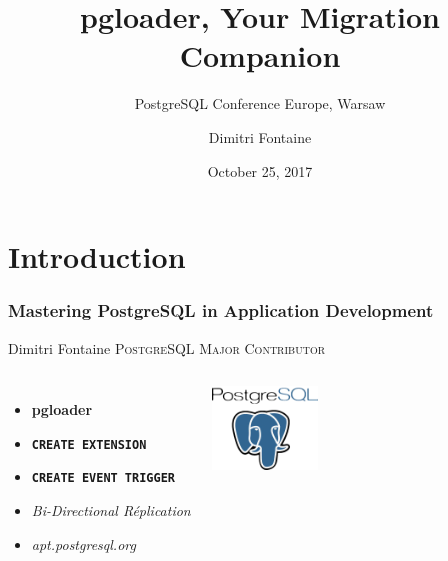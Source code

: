 \documentclass{beamer}
\title{pgloader, Your Migration Companion}
\subtitle{PostgreSQL Conference Europe, Warsaw}
\author{Dimitri Fontaine}
\institute{\href{http://MasteringPostgreSQL.com/}{Mastering PostgreSQL}}
\date{October 25, 2017}
\begin{document}
\section{Introduction}

\frame{\titlepage}

\begin{frame}[fragile]
  \frametitle{Mastering PostgreSQL in Application Development}

  \begin{center}
    {\Huge Dimitri Fontaine}
    \vfill
    {\Large \textsc{PostgreSQL Major Contributor}}
  \end{center}

\begin{columns}[c]

  \begin{itemize}
   \item \textbf{pgloader}
   \item \texttt{\textbf{CREATE EXTENSION}}
   \item \texttt{\textbf{CREATE EVENT TRIGGER}}
   \item \textit{Bi-Directional Réplication}
   \item \textit{apt.postgresql.org}
  \end{itemize}  

\begin{center}
  \includegraphics[height=6em]{postgres-logo.png}
\end{center}
\end{columns}
\end{frame}
\end{document}
